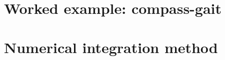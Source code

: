 \chapter{Worked example: compass-gait}
\setcounter{figure}{0}\setcounter{equation}{0}\setcounter{table}{0}

\clearpage

\chapter{Numerical integration method} \label{sec:numint}
\setcounter{figure}{0}\setcounter{equation}{0}\setcounter{table}{0}

\clearpage

